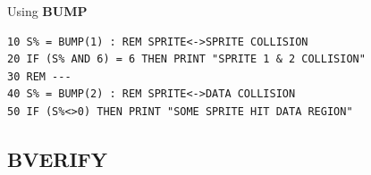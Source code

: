 \begin{description}[leftmargin=2cm,style=nextline]
\item [Example:]  Using {\bf BUMP}

\begin{tcolorbox}[colback=black,coltext=white]
\verbatimfont{\codefont}
\begin{verbatim}
10 S% = BUMP(1) : REM SPRITE<->SPRITE COLLISION
20 IF (S% AND 6) = 6 THEN PRINT "SPRITE 1 & 2 COLLISION"
30 REM ---
40 S% = BUMP(2) : REM SPRITE<->DATA COLLISION
50 IF (S%<>0) THEN PRINT "SOME SPRITE HIT DATA REGION"
\end{verbatim}
\end{tcolorbox}
\end{description}


\newpage
\subsection{BVERIFY}
